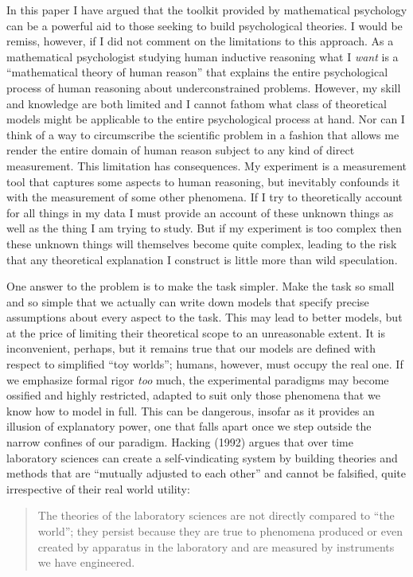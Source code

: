 \documentclass[
  english,
  doc]{apa6}
\begin{document}
\noindent
In this paper I have argued that the toolkit provided by mathematical psychology can be a powerful aid to those seeking to build psychological theories. I would be remiss, however, if I did not comment on the limitations to this approach. As a mathematical psychologist studying human inductive reasoning what I \emph{want} is a \enquote{mathematical theory of human reason} that explains the entire psychological process of human reasoning about underconstrained problems. However, my skill and knowledge are both limited and I cannot fathom what class of theoretical models might be applicable to the entire psychological process at hand. Nor can I think of a way to circumscribe the scientific problem in a fashion that allows me render the entire domain of human reason subject to any kind of direct measurement. This limitation has consequences. My experiment is a measurement tool that captures some aspects to human reasoning, but inevitably confounds it with the measurement of some other phenomena. If I try to theoretically account for all things in my data I must provide an account of these unknown things as well as the thing I am trying to study. But if my experiment is too complex then these unknown things will themselves become quite complex, leading to the risk that any theoretical explanation I construct is little more than wild speculation.

One answer to the problem is to make the task simpler. Make the task so small and so simple that we actually can write down models that specify precise assumptions about every aspect to the task. This may lead to better models, but at the price of limiting their theoretical scope to an unreasonable extent. It is inconvenient, perhaps, but it remains true that our models are defined with respect to simplified \enquote{toy worlds}; humans, however, must occupy the real one. If we emphasize formal rigor \emph{too} much, the experimental paradigms may become ossified and highly restricted, adapted to suit only those phenomena that we know how to model in full. This can be dangerous, insofar as it provides an illusion of explanatory power, one that falls apart once we step outside the narrow confines of our paradigm. Hacking (1992) argues that over time laboratory sciences can create a self-vindicating system by building theories and methods that are \enquote{mutually adjusted to each other} and cannot be falsified, quite irrespective of their real world utility:

\begin{quote}
The theories of the laboratory sciences are not directly compared to \enquote{the world}; they persist because they are true to phenomena produced or even created by apparatus in the laboratory and are measured by instruments we have engineered.
\end{quote}
\end{document}

